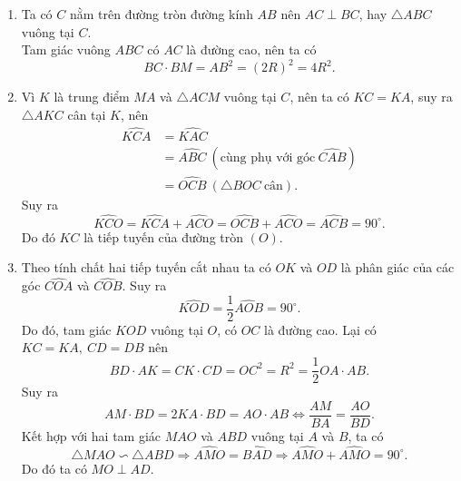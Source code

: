 \begin{bt}
{\begin{center}
\begin{tikzpicture}[scale=0.5, line join=round, line cap=round,>=stealth]
\end{tikzpicture}
\end{center} 
\begin{enumerate}
	\item Ta có $C$ nằm trên đường tròn đường kính $AB$ nên $AC\perp BC$, hay $\triangle ABC$ vuông tại $C$.\\
	Tam giác vuông $ABC$ có $AC$ là đường cao, nên ta có
	$$BC\cdot BM=AB^2=(2R)^2=4R^2.$$
	\item Vì $K$ là trung điểm $MA$ và $\triangle ACM$ vuông tại $C$, nên ta có $KC=KA$, suy ra $\triangle AKC$ cân tại $K$, nên  $$\begin{aligned} \widehat{KCA}&=\widehat{KAC}\\&=\widehat{ABC}\ (\text{cùng phụ với góc}\ \widehat{CAB}) \\&= \widehat{OCB}\ (\triangle BOC \ \text{cân}).
	 \end{aligned}$$
	Suy ra $$\widehat{KCO}=\widehat{KCA}+\widehat{ACO}=\widehat{OCB}+\widehat{ACO}=\widehat{ACB}=90^\circ.$$
	Do đó $KC$ là tiếp tuyến của đường tròn $(O).$
	\item Theo tính chất hai tiếp tuyến cắt nhau ta có $OK$ và $OD$ là phân giác của các góc $\widehat{COA}$ và $\widehat{COB}$. Suy ra $$\widehat{KOD}=\dfrac{1}{2}\widehat{AOB}=90^\circ.$$
	Do đó, tam giác $KOD$ vuông tại $O$, có $OC$ là đường cao. Lại có $KC=KA,\ CD=DB$ nên 
	$$BD\cdot AK=CK\cdot CD=OC^2=R^2=\dfrac{1}{2}OA\cdot  AB.$$
	Suy ra $$AM\cdot BD=2KA\cdot BD=AO\cdot AB \Leftrightarrow \dfrac{AM}{BA}=\dfrac{AO}{BD}.$$
	Kết hợp với hai tam giác $MAO$ và $ABD$ vuông tại $A$ và $B$, ta có $$\triangle MAO \backsim \triangle ABD \Rightarrow \widehat{AMO}=\widehat{BAD}\Rightarrow \widehat{AMO}+\widehat{AMO}=90^\circ.$$
	Do đó ta có $MO\perp AD.$
\end{enumerate}
}
\end{bt}

